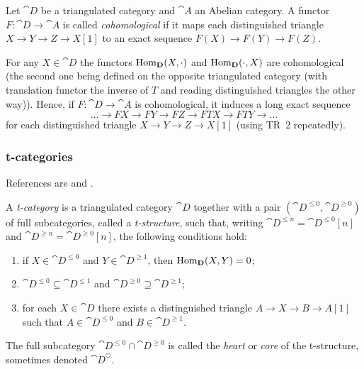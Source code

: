 \documentclass[english]{short-notes}
\begin{document}
\begin{Def}
    Let $\cat D$ be a triangulated category and $\cat A$ an Abelian category.
    A functor $F\colon \cat D → \cat A$ is called \emph{cohomological} if it maps each distinguished triangle $X → Y → Z → X[1]$ to an exact sequence $F(X) → F(Y) → F(Z)$.
\end{Def}

\begin{Ex}
    For any $X ∈ \cat D$ the functors $\operatorname{Hom}_{\mathbf D}(X,\cdot)$ and $\operatorname{Hom}_{\mathbf D}(\cdot, X)$  are cohomological (the second one being defined on the opposite triangulated category (with translation functor the inverse of $T$ and reading distinguished triangles the other way)).
    Hence, if $F\colon \cat D → \cat A$ is cohomological, it induces a long exact sequence
    \[
    \dotsc → FX → FY → FZ → FTX → FTY → \dotsc
    \]
    for each distinguished triangle $X → Y → Z → X[1]$ (using TR~2 repeatedly).
\end{Ex}

\subsubsection{t-categories}\label{sec:t-categories}

References are \cite[Section 1.3]{BeilinsonBernsteinDeligne:1982:FaisceauxPervers} and \cite[Section IV.4]{GelfandManin:2003:MethodsOfHomologicalAlgebra}.

\begin{Def}
    A \emph{t-category} is a triangulated category $\cat D$ together with a pair $(\cat D^{≤0},\cat D^{≥0})$ of full subcategories, called a \emph{t-structure}, such that, writing $\cat D^{≤n} = \cat D^{≤0}[n]$ and $\cat D^{≥n} = \cat D^{≥0}[n]$, the following conditions hold:
    \begin{enumerate}
        \item if $X ∈ \cat D^{≤0}$ and $Y ∈ \cat D^{≥1}$, then $\operatorname{Hom}_{\mathbf D}(X,Y) = 0$;
        \item $\cat D^{≤0} ⊆ \cat D^{≤1}$ and $\cat D^{≥0} ⊇ \cat D^{≥1}$;
        \item for each $X ∈ \cat D$ there exists a distinguished triangle $A → X → B → A[1]$ such that $A ∈ \cat D^{≤0}$ and $B ∈ \cat D^{≥1}$.
    \end{enumerate}

    The full subcategory $\cat D^{≤0} ∩ \cat D^{≥0}$ is called the \emph{heart} or \emph{core} of the t-structure, sometimes denoted $\cat D^\heartsuit$.
\end{Def}
\end{document}
